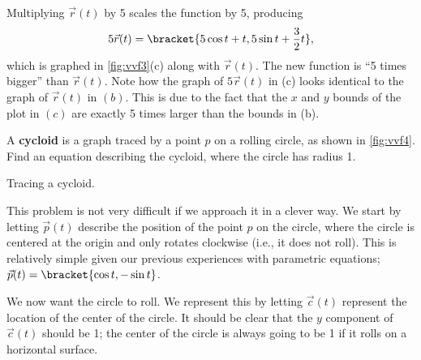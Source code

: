 \begin{example}
Multiplying $\vec r(t)$ by 5 scales the function by 5, producing
\[5\vec r(t) =\bracket{5\cos t+t,5\sin t+\frac32t},\]
which is graphed in \autoref{fig:vvf3}(c) along with $\vec r(t)$. The new function is ``5 times bigger'' than $\vec r(t)$. Note how the graph of $5\vec r(t)$ in (c) looks identical to the graph of $\vec r(t)$ in $(b)$. This is due to the fact that the $x$ and $y$ bounds of the plot in $(c)$ are exactly 5 times larger than the bounds in (b).
\end{example}

\begin{example}\label{ex_vvf4}
A \textbf{cycloid} is a graph traced by a point $p$ on a rolling circle, as shown in \autoref{fig:vvf4}. Find an equation describing the cycloid, where the circle has radius 1.
{\centering
{}
\captionsetup{type=figure}
\caption{Tracing a cycloid.}\label{fig:vvf4}
}%
\solution
This problem is not very difficult if we approach it in a clever way. We start by letting $\vec p(t)$ describe the position of the point $p$ on the circle, where the circle is centered at the origin and only rotates clockwise (i.e., it  does not roll). This is relatively simple given our previous experiences with parametric equations; $\vec p(t) =\bracket{\cos t, -\sin t}$. 

We now want the circle to roll. We represent this by letting $\vec c(t)$ represent the location of the center of the circle. It should be clear that the $y$ component of $\vec c(t)$ should be 1; the center of the circle is always going to be 1 if it rolls on a horizontal surface.



\end{example}
